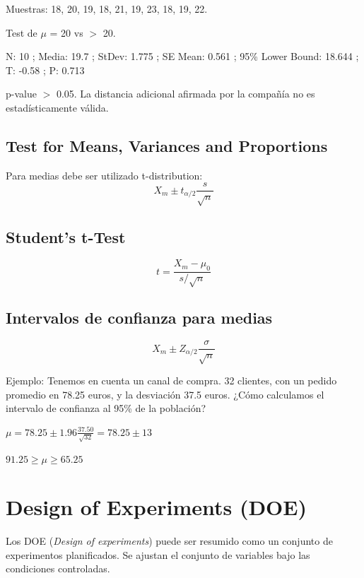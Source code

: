 \documentclass[]{article}
\begin{document}
Muestras: 18, 20, 19, 18, 21, 19, 23, 18, 19, 22. 
 
Test de $\mu$ = 20 vs $>$ 20. 

N: 10 ; Media: 19.7 ; StDev: 1.775 ; SE Mean: 0.561 ; 95\% Lower Bound: 18.644 ; T: -0.58 ; P: 0.713 

p-value $>$ 0.05. La distancia adicional afirmada por la compañía no es estadísticamente válida.

\subsection{Test for Means, Variances and Proportions}

Para medias debe ser utilizado t-distribution:
\begin{equation}
X_m \pm t_{\alpha/2}\frac{s}{\sqrt{n}}
\end{equation}

\subsection{Student's t-Test}
\begin{equation}
t = \frac{X_m-\mu_0}{s/\sqrt{n}}
\end{equation}

\subsection{Intervalos de confianza para medias}
\begin{equation}
X_m \pm Z_{\alpha/2} \frac{\sigma}{\sqrt{n}}
\end{equation}

Ejemplo: Tenemos en cuenta un canal de compra. 32 clientes, con un pedido promedio en 78.25 euros, y la desviación 37.5 euros. ¿Cómo calculamos el intervalo de confianza al 95\% de la población? \newline
\begin{center}$\mu = 78.25 \pm 1.96\frac{37.50}{\sqrt{32}} = 78.25 \pm 13$ \end{center} 
\begin{center}$91.25 \geq \mu \geq 65.25 $ \end{center}

\section{Design of Experiments (DOE)}

Los DOE (\textit{Design of experiments}) puede ser resumido como un conjunto de experimentos planificados. Se ajustan el conjunto de variables bajo las condiciones controladas.
\end{document}

